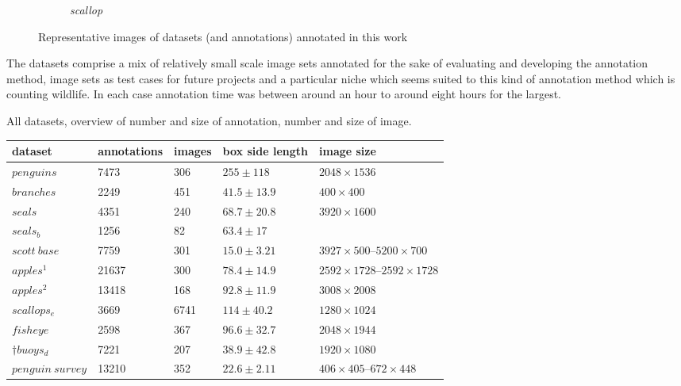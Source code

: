 \begin{figure}[h!]
\begin{subfigure}[t]{0.24\linewidth}
  \caption{\emph{scallop}}
\end{subfigure}
\caption{Representative images of datasets (and annotations) annotated in this work}
\label{fig:datasets_all}
\end{figure}

The datasets comprise a mix of relatively small scale image sets annotated for the sake of evaluating and developing the annotation method, image sets as test cases for future projects and a particular niche which seems suited to this kind of annotation method which is counting wildlife. In each case annotation time was between around an hour to around eight hours for the largest.

\begin{threeparttable}[!h]
\label{fig:resolutions}
\centering
\caption{All datasets, overview of number and size of annotation, number and size of image.  } 
\begin{tabular}{lllll}
dataset           & annotations & images & box side length & image size                       \\
\toprule
$penguins$       & 7473        & 306    & $255 \pm 118$   & $2048\times1536$                     \\
$branches$       & 2249        & 451    & $41.5 \pm 13.9$ & $400\times400$                       \\
$seals$          & 4351        & 240    & $68.7 \pm 20.8$ & $3920\times1600$                     \\
$seals_b$      & 1256        & 82     & $63.4 \pm 17$   &                                        \\
$scott\:base$     & 7759        & 301    & $15.0 \pm 3.21$   & $3927\times500\text{--}5200\times700$   \\
$apples^1$     & 21637       & 300    & $78.4 \pm 14.9$ & $2592\times1728\text{--}2592\times1728$ \\
$apples^2$     & 13418       & 168    & $92.8 \pm 11.9$ & $3008\times2008$                     \\
$scallops_e$   & 3669        & 6741   & $114 \pm 40.2$  & $1280\times1024$                     \\
$fisheye$        & 2598        & 367    & $96.6 \pm 32.7$ & $2048\times1944$                     \\
$\dagger buoys_d$      & 7221        & 207    & $38.9 \pm 42.8$ & $1920\times1080$                     \\
$penguin\:survey$ & 13210       & 352    & $22.6 \pm 2.11$ & $406\times405\text{--}672\times448$    \\

\end{tabular}
\end{threeparttable}
